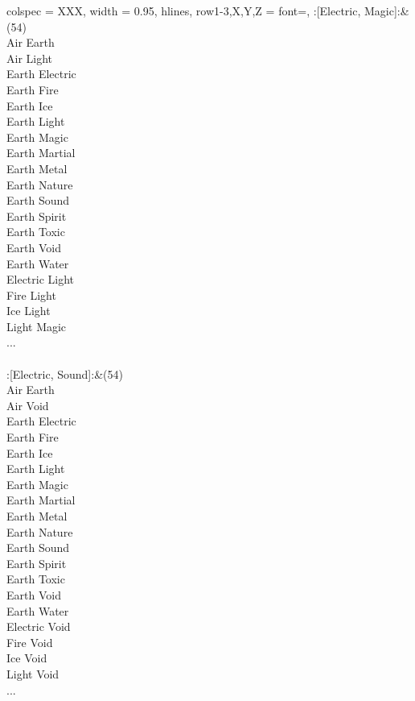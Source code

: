 \begin{longtblr}[
	caption = {2v2 Defending Weak},
	label = {2v2-Defending-Weak},
]{
	colspec = {XXX}, width = 0.95\linewidth,
	hlines,
	row{1-3,X,Y,Z} = {font=\bfseries},
}
	:[Electric, Magic]:&{(54)\\
	Air Earth \\
	Air Light \\
	Earth Electric \\
	Earth Fire \\
	Earth Ice \\
	Earth Light \\
	Earth Magic \\
	Earth Martial \\
	Earth Metal \\
	Earth Nature \\
	Earth Sound \\
	Earth Spirit \\
	Earth Toxic \\
	Earth Void \\
	Earth Water \\
	Electric Light \\
	Fire Light \\
	Ice Light \\
	Light Magic \\
	...\\
	}\\

	:[Electric, Sound]:&{(54)\\
	Air Earth \\
	Air Void \\
	Earth Electric \\
	Earth Fire \\
	Earth Ice \\
	Earth Light \\
	Earth Magic \\
	Earth Martial \\
	Earth Metal \\
	Earth Nature \\
	Earth Sound \\
	Earth Spirit \\
	Earth Toxic \\
	Earth Void \\
	Earth Water \\
	Electric Void \\
	Fire Void \\
	Ice Void \\
	Light Void \\
	...\\
	}\\


\end{longtblr}
